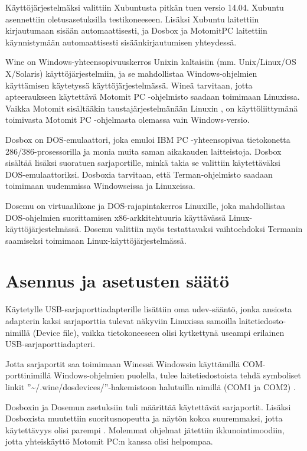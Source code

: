 Käyttöjärjestelmäksi valittiin Xubuntusta pitkän tuen versio 14.04. Xubuntu asennettiin oletusasetuksilla testikoneeseen. Lisäksi Xubuntu laitettiin kirjautumaan sisään automaattisesti, ja Dosbox ja MotomitPC laitettiin käynnistymään automaattisesti sisäänkirjautumisen yhteydessä.

Wine on Windows-yhteensopivuuskerros Unixin kaltaisiin (mm. Unix/Linux/OS X/Solaris) käyttöjärjestelmiin, ja se mahdollistaa Windows-ohjelmien käyttämisen käytetyssä käyttöjärjestelmässä. Wineä tarvitaan, jotta apteeraukseen käytettävä Motomit PC -ohjelmisto saadaan toimimaan Linuxissa. Vaikka Motomit sisältääkin taustajärjestelmänään Linuxin \cite{motomit:manual}, on käyttöliittymänä toimivasta Motomit PC -ohjelmasta olemassa vain Windows-versio.

Dosbox on DOS-emulaattori, joka emuloi IBM PC -yhteensopivaa tietokonetta 286/386-prosessorilla ja monia muita saman aikakauden laitteistoja. Dosbox sisältää lisäksi suoratuen sarjaportille, minkä takia se valittiin käytettäväksi DOS-emulaattoriksi. Dosboxia tarvitaan, että Terman-ohjelmisto saadaan toimimaan uudemmissa Windowseissa ja Linuxeissa.

Dosemu on virtuaalikone ja DOS-rajapintakerros Linuxille, joka mahdollistaa DOS-ohjelmien suorittamisen x86-arkkitehtuuria käyttävässä Linux-käyttöjärjestelmässä. Dosemu valittiin myös testattavaksi vaihtoehdoksi Termanin saamiseksi toimimaan Linux-käyttöjärjestelmässä.

\section{Asennus ja asetusten säätö}
Käytetylle USB-sarjaporttiadapterille lisättiin oma udev-sääntö, jonka ansiosta adapterin kaksi sarjaporttia tulevat näkyviin Linuxissa samoilla laitetiedosto-nimillä (Device file), vaikka tietokoneeseen olisi kytkettynä useampi erilainen USB-sarjaporttiadapteri.

Jotta sarjaportit saa toimimaan Winessä Windowsin käyttämillä COM-porttinimillä Windows-ohjelmien puolella, tulee laitetiedostoista tehdä symboliset linkit ''\textasciitilde{}/.wine/dosdevices/''-hakemistoon halutuilla nimillä (COM1 ja COM2) \cite[s. 21]{wine:manual}.

Dosboxin ja Dosemun asetuksiin tuli määrittää käytettävät sarjaportit. Lisäksi Dosboxista muutettiin suoritusnopeutta ja näytön kokoa suuremmaksi, jotta käytettävyys olisi parempi \cite{dosbox:conf}. Molemmat ohjelmat jätettiin ikkunointimoodiin, jotta yhteiskäyttö Motomit PC:n kanssa olisi helpompaa.


